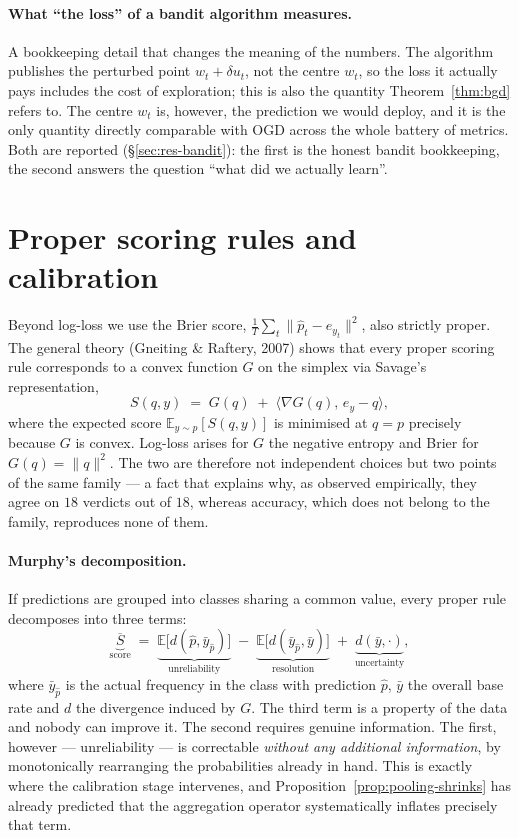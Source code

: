 \documentclass[12pt,a4paper,oneside]{report}
\renewcommand{\_}{\oldunderscore\allowbreak}
\theoremstyle{definition}
\theoremstyle{plain}
\theoremstyle{remark}
\begin{document}
\paragraph{What ``the loss'' of a bandit algorithm measures.} A bookkeeping detail that changes
the meaning of the numbers. The algorithm publishes the perturbed point $w_t + \delta u_t$, not
the centre $w_t$, so the loss it actually pays includes the cost of exploration; this is also the
quantity Theorem~\ref{thm:bgd} refers to. The centre $w_t$ is, however, the prediction we would
deploy, and it is the only quantity directly comparable with OGD across the whole battery of
metrics. Both are reported (\S\ref{sec:res-bandit}): the first is the honest bandit bookkeeping,
the second answers the question ``what did we actually learn''.

\section{Proper scoring rules and calibration}
\label{sec:calib-theory}

Beyond log-loss we use the Brier score, $\frac{1}{T}\sum_t \|\hat{p}_t - e_{y_t}\|^2$, also
strictly proper. The general theory (Gneiting \& Raftery, 2007) shows that every proper scoring
rule corresponds to a convex function $G$ on the simplex via Savage's representation,
\[
S(q,y) \;=\; G(q) \;+\; \langle \nabla G(q),\, e_y - q\rangle,
\]
where the expected score $\mathbb{E}_{y\sim p}[S(q,y)]$ is minimised at $q=p$ precisely because
$G$ is convex. Log-loss arises for $G$ the negative entropy and Brier for $G(q)=\|q\|^2$. The two
are therefore not independent choices but two points of the same family --- a fact that explains
why, as observed empirically, they agree on $18$ verdicts out of $18$, whereas accuracy, which
does not belong to the family, reproduces none of them.

\paragraph{Murphy's decomposition.} If predictions are grouped into classes sharing a common
value, every proper rule decomposes into three terms:
\[
\underbrace{\overline{S}}_{\text{score}} \;=\;
\underbrace{\mathbb{E}\big[ d(\hat{p}, \bar{y}_{\hat{p}}) \big]}_{\text{unreliability}}
\;-\; \underbrace{\mathbb{E}\big[ d(\bar{y}_{\hat{p}}, \bar{y}) \big]}_{\text{resolution}}
\;+\; \underbrace{d(\bar{y}, \cdot)}_{\text{uncertainty}},
\]
where $\bar{y}_{\hat{p}}$ is the actual frequency in the class with prediction $\hat{p}$,
$\bar{y}$ the overall base rate and $d$ the divergence induced by $G$. The third term is a
property of the data and nobody can improve it. The second requires genuine information. The
first, however --- unreliability --- is correctable \emph{without any additional information}, by
monotonically rearranging the probabilities already in hand. This is exactly where the
calibration stage intervenes, and Proposition~\ref{prop:pooling-shrinks} has already predicted
that the aggregation operator systematically inflates precisely that term.
\end{document}
